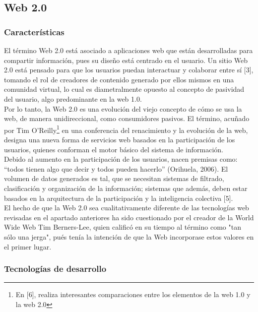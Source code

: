 \subsection{Web 2.0}

\subsubsection{Características}

El término Web 2.0 está asociado a aplicaciones web que están desarrolladas para compartir información, 
pues su diseño está centrado en el usuario. Un sitio Web 2.0 está pensado para que los usuarios puedan 
interactuar y colaborar entre sí [3], tomando el rol de creadores de contenido generado por ellos mismos 
en una comunidad virtual, lo cual es diametralmente opuesto al concepto de pasividad del usuario, algo 
predominante en la web 1.0.\\

Por lo tanto, la Web 2.0 es una evolución del viejo concepto de cómo se usa la web, de manera unidireccional, 
como consumidores pasivos. El término, acuñado por Tim O'Reilly\footnote{En [6], realiza interesantes comparaciones 
entre los elementos de la web 1.0 y la web 2.0} en una conferencia del renacimiento y la evolución de la web, 
designa una nueva forma de servicios web basados en la participación de los usuarios, quienes conforman el 
motor básico del sistema de información.\\

Debido al aumento en la participación de los usuarios, nacen premisas como: “todos tienen algo que decir 
y todos pueden hacerlo” (Orihuela, 2006). El volumen de datos generados es tal, que se necesitan sistemas 
de filtrado, clasificación y organización de la información; sistemas que además, deben estar basados en la 
arquitectura de la participación y la inteligencia colectiva [5].\\


El hecho de que la Web 2.0 sea cualitativamente diferente de las tecnologías web revisadas en el 
apartado anteriores ha sido cuestionado por el creador de la World Wide Web Tim Berners-Lee, quien 
calificó en su tiempo al término como "tan sólo una jerga", pués tenía la intención de que la Web 
incorporase estos valores en el primer lugar. 


\subsubsection{Tecnologías de desarrollo}

